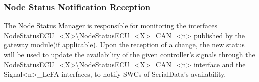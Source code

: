 {           }

\subsubsection{Node Status Notification Reception}

The Node Status Manager is responsible for monitoring the interfaces NodeStatusECU_<X>\textbackslash NodeStatusECU_<X>_CAN_<n> published by the gateway module(if applicable).
Upon the reception of a change, the new status will be used to update the availability of the given controller's signals
through the NodeStatusECU_<X>\textbackslash NodeStatusECU_<X>_CAN_<n> interface and the Signal<n>_LcFA interfaces, to notify SWCs of SerialData's availability.

{       }

